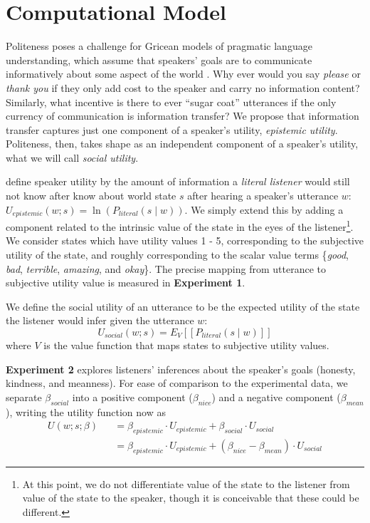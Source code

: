 \documentclass[10pt,letterpaper]{article}
\newcommand{\denote}[1]{\mbox{ $[\![ #1 ]\!]$}}
\begin{document}
\section{Computational Model}

Politeness poses a challenge for Gricean models of pragmatic language understanding, which assume that speakers' goals are to communicate informatively about some aspect of the world \cite{Frank2012, Goodman2013}. 
Why ever would you say \emph{please} or \emph{thank you} if they only add cost to the speaker and carry no information content?
Similarly, what incentive is there to ever ``sugar coat'' utterances if the only currency of communication is information transfer? 
We propose that information transfer captures just one component of a speaker's utility, \emph{epistemic utility}.
Politeness, then, takes shape as an independent component of a speaker's utility, what we will call \emph{social utility}. 

 define speaker utility by the amount of information a \emph{literal listener} would still not know after know about world state $s$ after hearing a speaker's utterance $w$: 
$U_{epistemic}(w; s) = \ln(P_{literal}(s \mid w)) $.
We simply extend this by adding a component related to the intrinsic value of the state in the eyes of the listener\footnote{At this point, we do not differentiate value of the state to the listener from value of the state to the speaker, though it is conceivable that these could be different.}.
We consider states which have utility values 1 - 5, corresponding to the subjective utility of the state, and roughly corresponding to the scalar value terms \{\emph{good}, \emph{bad}, \emph{terrible}, \emph{amazing}, and \emph{okay}\}. 
The precise mapping from utterance to subjective utility value is measured in \textbf{Experiment 1}.

We define the social utility of an utterance to be the expected utility of the state the listener would infer given the utterance $w$: 
%
$$
U_{social}(w; s) = E_{V}[[P_{literal}(s \mid w)]]
$$
%
where $V$ is the value function that maps states to subjective utility values. 




\textbf{Experiment 2} explores listeners' inferences about the speaker's goals (honesty, kindness, and meanness).
For ease of comparison to the experimental data, we separate $\beta_{social}$ into a positive component ($\beta_{nice}$) and a negative component ($\beta_{mean}$), writing the utility function now as
\begin{eqnarray*}
U(w;s; \beta) && = \beta_{epistemic}\cdot U_{epistemic} + \beta_{social} \cdot U_{social} \\
&&= \beta_{epistemic}\cdot U_{epistemic} + (\beta_{nice} - \beta_{mean}) \cdot U_{social}
\end{eqnarray*}
\end{document}
